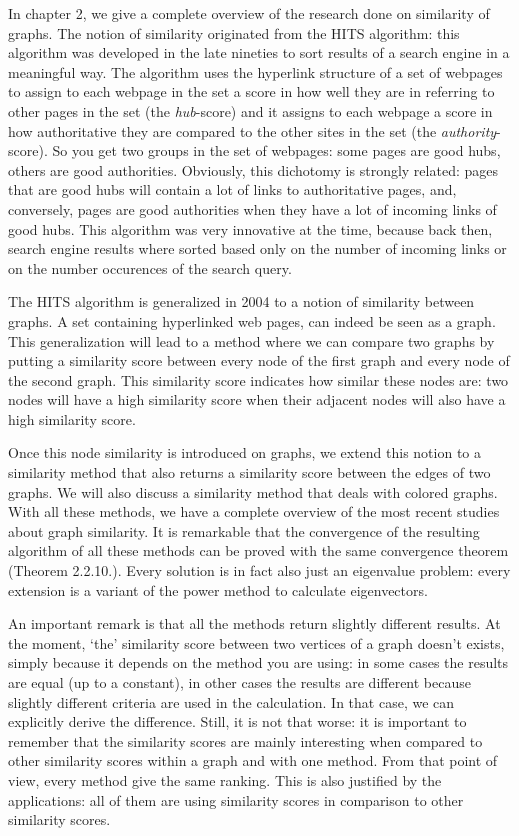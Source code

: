 \documentclass[a4paper,11pt]{report}
\begin{document}
In chapter 2, we give a complete overview of the research done on similarity of 
graphs. The notion of similarity originated from the HITS algorithm: this 
algorithm was developed in the late nineties to sort results of a search 
engine in a meaningful way. The algorithm uses the hyperlink structure of a set 
of webpages to assign to each webpage in the set a score in how well they are in referring to other pages
in the set (the \emph{hub}-score)  and it assigns to each webpage a score in how 
authoritative they are compared to the other sites in the set (the 
\emph{authority}-score). So you get two groups in the set of webpages: some pages are good hubs, others are good
authorities. Obviously, this dichotomy is strongly related: pages that are good 
hubs will contain a lot of links to authoritative pages, and, conversely, pages 
are good authorities when they have a lot of incoming links of good hubs. This 
algorithm was very innovative at the time, because back then,  search engine results where 
sorted based only on the number of incoming links or on the number 
occurences of the search query.

The HITS algorithm is generalized in 2004 to a notion of similarity between 
graphs. A set containing hyperlinked web pages, can indeed be seen as a graph. 
This generalization will lead to a method where we can compare two graphs by putting a similarity score
between every node of the first graph and every node of the second graph. This similarity score 
indicates how similar these nodes are: two nodes will have a high similarity 
score when their adjacent nodes will also have a high similarity score. 

Once this node similarity is introduced on graphs, we extend this notion to a 
similarity method that also returns a similarity score between the edges of two 
graphs. We will also discuss a similarity method that deals with colored 
graphs. With all these methods, we have a complete overview of the most recent 
studies about graph similarity. It is remarkable that the convergence of 
the resulting algorithm of all these methods can be proved with the same 
convergence theorem (Theorem 2.2.10.). Every solution is in fact also just an eigenvalue problem: 
every extension is a variant of the power method to calculate eigenvectors.

An important remark is that all the methods return slightly different results. 
At the moment, `the' similarity score between two vertices of a graph doesn't 
exists, simply because it depends on the method you are using: in some cases the 
results are equal (up to a constant), in other cases the results are 
different because slightly different criteria are used in the calculation. In 
that case, we can explicitly derive the difference.
Still, it is not that worse: it is important to remember that the similarity 
scores are mainly interesting when compared to other similarity scores within a graph and with one method. From that point of view,
every method give the same ranking. This is also justified by the applications: all 
of them are using similarity scores in comparison to other similarity scores. 
\end{document}
